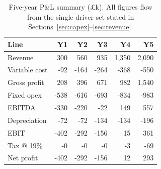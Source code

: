 \begin{table}[H]
\centering
\small
\caption{Five-year P\&L summary (\pounds k). All figures flow from 
the single driver set stated in Sections~\ref{sec:capex}--\ref{sec:revenue}.}
\label{tab:pnl}
\begin{tabular}{lrrrrr}
\toprule
\textbf{Line} & \textbf{Y1} & \textbf{Y2} & \textbf{Y3} & \textbf{Y4} & \textbf{Y5} \\
\midrule
Revenue & 300 & 560 & 935 & 1,350 & 2,090 \\
Variable cost & -92 & -164 & -264 & -368 & -550 \\
Gross profit & 208 & 396 & 671 & 982 & 1,540 \\
Fixed opex & -538 & -616 & -693 & -834 & -983 \\
EBITDA & -330 & -220 & -22 & 149 & 557 \\
Depreciation & -72 & -72 & -134 & -134 & -196 \\
EBIT & -402 & -292 & -156 & 15 & 361 \\
Tax @ 19\% & -0 & -0 & -0 & -3 & -69 \\
Net profit & -402 & -292 & -156 & 12 & 293 \\
\bottomrule
\end{tabular}
\end{table}
